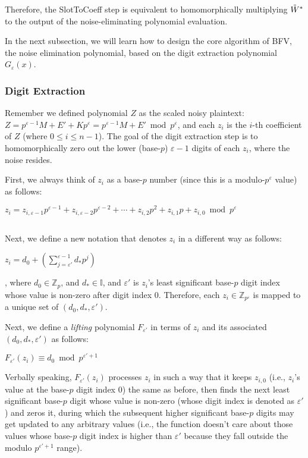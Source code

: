 Therefore, the \textsf{SlotToCoeff} step is equivalent to homomorphically multiplying $\tilde{W}^*$ to the output of the noise-eliminating polynomial evaluation.  

In the next subsection, we will learn how to design the core algorithm of BFV, the noise elimination polynomial, based on the digit extraction polynomial $G_\varepsilon(x)$. 


\subsubsection{Digit Extraction}
\label{subsubsec:bfv-bootstrapping-digit-extraction}


Remember we defined polynomial $Z$ as the scaled noisy plaintext: $Z = p^{\varepsilon-1}M + E' + Kp^\varepsilon = p^{\varepsilon-1}M + E' \bmod p^\varepsilon$, and each $z_i$ is the $i$-th coefficient of $Z$ (where $0 \leq i \leq n -1$). The goal of the digit extraction step is to homomorphically zero out the lower (base-$p$) $\varepsilon-1$  digits of each $z_i$, where the noise resides.%

First, we always think of $z_i$ as a base-$p$ number (since this is a modulo-$p^\varepsilon$ value) as follows:

$z_i = z_{i, \varepsilon-1}p^{\varepsilon-1} + z_{i, \varepsilon-2}p^{\varepsilon-2} + \cdots + z_{i, 2}p^2 + z_{i, 1}p + z_{i, 0} \bmod p^\varepsilon$

$ $

Next, we define a new notation that denotes $z_i$ in a different way as follows: 

$z_i = d_0 + \left(\sum\limits_{j=\varepsilon'}^{\varepsilon-1} d_* p^j\right)$

, where $d_0 \in \mathbb{Z}_p$, and $d_* \in \mathbb{I}$, and $\varepsilon'$ is $z_i$'s least significant base-$p$ digit index whose value is non-zero after digit index 0. Therefore, each $z_i \in \mathbb{Z}_{p^\varepsilon}$ is mapped to a unique set of $(d_0, d_*, \varepsilon')$. 


Next, we define a \textit{lifting} polynomial $F_{\varepsilon'}$ in terms of $z_i$ and its associated $(d_0, d_*, \varepsilon')$ as follows:

$F_{\varepsilon'}(z_i) \equiv d_0 \bmod p^{\varepsilon'+1}$

Verbally speaking, $F_{\varepsilon'}(z_i)$ processes $z_i$ in such a way that it keeps $z_{i,0}$ (i.e., $z_{i}$'s value at the base-$p$ digit index 0) the same as before, then finds the next least significant base-$p$ digit whose value is non-zero (whose digit index is denoted as $\varepsilon'$) and zeros it, during which the subsequent higher significant base-$p$ digits may get updated to any arbitrary values (i.e., the function doesn't care about those values whose base-$p$ digit index is higher than $\varepsilon'$ because they fall outside the modulo $p^{\varepsilon' + 1}$ range). 

